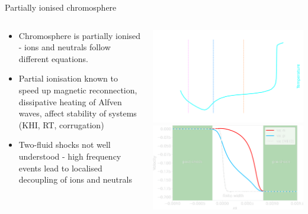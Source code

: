 \documentclass[10pt,aspectratio=169,usenames,dvipsnames]{beamer}
\begin{document}
\begin{frame}{Partially ionised chromosphere}
\begin{columns}
\begin{column}{0.5\textwidth}
\begin{itemize}
    \item Chromosphere is partially ionised - ions and neutrals follow different equations.
    \item Partial ionisation known to speed up magnetic reconnection, dissipative heating of Alfven waves, affect stability of systems (KHI, RT, corrugation)
    \item Two-fluid shocks not well understood - high frequency events lead to localised decoupling of ions and neutrals
\end{itemize}
\end{column}
\begin{column}{0.5\textwidth}
\includegraphics[width=0.9\linewidth]{2023StAndrewsAstro/Figures/saha2_plot.png} \\
\includegraphics[width=0.95\linewidth]{2023StAndrewsAstro/Figures/shocksub_col.png} \\
\end{column}
\end{columns}
\end{frame}
\end{document}
